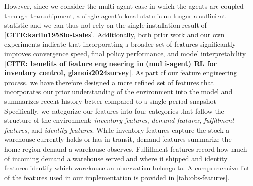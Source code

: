 However, since we consider the multi-agent case in which the agents are coupled through transshipment, a single agent's local state is no longer a sufficient statistic and we can thus not rely on the single-installation result of [\textbf{CITE:{karlin1958lostsales}}]. Additionally, both prior work and our own experiments indicate that incorporating a broader set of features significantly improves convergence speed, final policy performance, and model interpretability [\textbf{CITE: benefits of feature engineering in (multi-agent) RL for inventory control, {glanois2024survey}}]. As part of our feature engineering process, we have therefore designed a more refined set of features that incorporates our prior understanding of the environment into the model and summarizes recent history better compared to a single-period snapshot. Specifically, we categorize our features into four categories that follow the structure of the environment: \textit{inventory features}, \textit{demand features}, \textit{fulfillment features}, and \textit{identity features}. While inventory features capture the stock a warehouse currently holds or has in transit, demand features summarize the home-region demand a warehouse observes. Fulfillment features record how much of incoming demand a warehouse served and where it shipped and identity features identify which warehouse an observation belongs to. A comprehensive list of the features used in our implementation is provided in \autoref{tab:obs-features}. 

